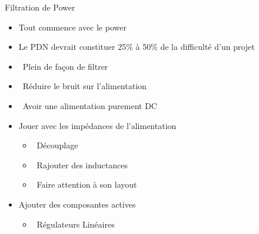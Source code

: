 \begin{frame}{Filtration de Power}
    \begin{itemize}
        \item Tout commence avec le power
        \item Le PDN devrait constituer 25\% à 50\% de la difficulté d'un projet
        \bigskip
        \item[] \hspace{-12pt}\textcolor{UDSgreenFierte}{\faList}
            ~Plein de façon de filtrer
        \item[] \hspace{-12pt}\textcolor{UDSgreenFierte}{\faWater}
            ~Réduire le bruit sur l'alimentation
        \item[] \hspace{-12pt}\textcolor{UDSgreenFierte}{\faMinus}
            ~Avoir une alimentation purement DC
        \bigskip
        \item<2-> Jouer avec les impédances de l'alimentation
        \begin{itemize}
            \item<2->[] \textcolor{UDSgreenFierte}{\faEquals} ~Découplage 
            \item<2->[] \textcolor{UDSgreenFierte}{\faSync} ~Rajouter des inductances
            \item<2->[] \textcolor{UDSgreenFierte}{\faPuzzlePiece} ~Faire attention à son layout 
        \end{itemize}
        \item<2-> Ajouter des composantes actives
        \begin{itemize}
            \item<2->[] \textcolor{UDSgreenFierte}{\faRulerHorizontal} ~Régulateurs Linéaires
        \end{itemize}
    \end{itemize}
\end{frame}

